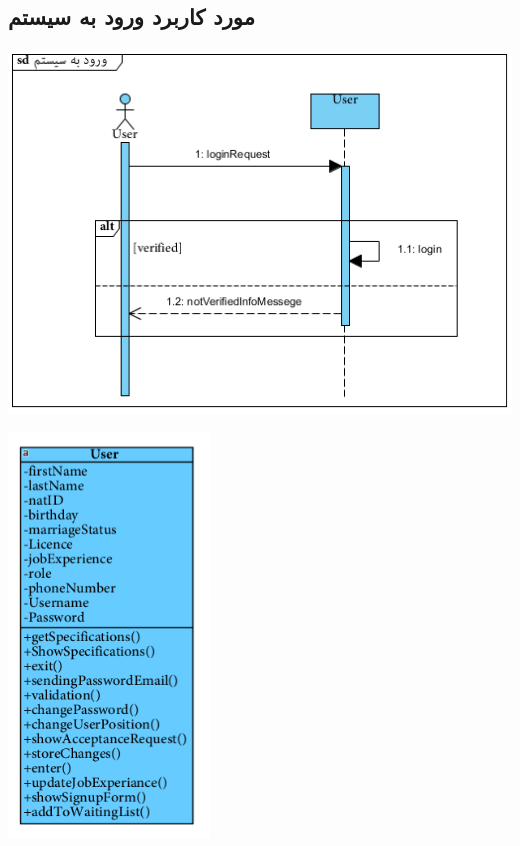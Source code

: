 \newpage
\vspace{2cm}
\subsection*{مورد کاربرد ورود به سیستم}
\vspace{2cm}
\begin{center}
\includegraphics[width=\textwidth]{SequenceDiagrams/10.png}
\end{center}

\newpage
\vspace{2cm}
\begin{center}
\includegraphics[width=0.4\textwidth]{SequenceClasses/10.png}
\end{center}


